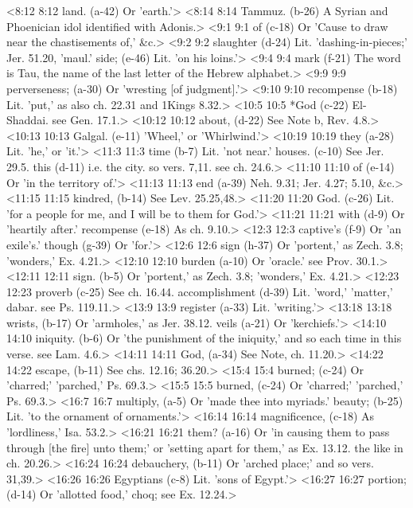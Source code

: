 <8:12 8:12  land. (a-42)  Or 'earth.'>
<8:14 8:14  Tammuz. (b-26)  A Syrian and Phoenician idol identified with Adonis.>
<9:1 9:1  of (c-18)  Or 'Cause to draw near the chastisements of,' &c.>
<9:2 9:2  slaughter (d-24)  Lit. 'dashing-in-pieces;' Jer. 51.20, 'maul.'
  side; (e-46)  Lit. 'on his loins.'>
<9:4 9:4  mark (f-21)  The word is Tau, the name of the last letter of the Hebrew  alphabet.>
<9:9 9:9  perverseness; (a-30)  Or 'wresting [of judgment].'>
<9:10 9:10  recompense (b-18)  Lit. 'put,' as also ch. 22.31 and 1Kings 8.32.>
<10:5 10:5  *God (c-22)  El-Shaddai. see Gen. 17.1.>
<10:12 10:12  about, (d-22)  See Note b, Rev. 4.8.>
<10:13 10:13  Galgal. (e-11)  'Wheel,' or 'Whirlwind.'>
<10:19 10:19  they (a-28)  Lit. 'he,' or 'it.'>
<11:3 11:3  time (b-7)  Lit. 'not near.'
  houses. (c-10)  See Jer. 29.5.
  this (d-11)  i.e. the city. so vers. 7,11. see ch. 24.6.>
<11:10 11:10  of (e-14)  Or 'in the territory of.'>
<11:13 11:13  end (a-39)  Neh. 9.31; Jer. 4.27; 5.10, &c.>
<11:15 11:15  kindred, (b-14)  See Lev. 25.25,48.>
<11:20 11:20  God. (c-26)  Lit. 'for a people for me, and I will be to them for God.'>
<11:21 11:21  with (d-9)  Or 'heartily after.'
  recompense (e-18)  As ch. 9.10.>
<12:3 12:3  captive's (f-9)  Or 'an exile's.'
  though (g-39)  Or 'for.'>
<12:6 12:6  sign (h-37)  Or 'portent,' as Zech. 3.8; 'wonders,' Ex. 4.21.>
<12:10 12:10  burden (a-10)  Or 'oracle.' see Prov. 30.1.>
<12:11 12:11  sign. (b-5)  Or 'portent,' as Zech. 3.8; 'wonders,' Ex. 4.21.>
<12:23 12:23  proverb (c-25)  See ch. 16.44.
  accomplishment (d-39)  Lit. 'word,' 'matter,' dabar. see Ps. 119.11.>
<13:9 13:9  register (a-33)  Lit. 'writing.'>
<13:18 13:18  wrists, (b-17)  Or 'armholes,' as Jer. 38.12.
  veils (a-21)  Or 'kerchiefs.'>
<14:10 14:10  iniquity. (b-6)  Or 'the punishment of the iniquity,' and so each time in this  verse. see Lam. 4.6.>
<14:11 14:11  God, (a-34)  See Note, ch. 11.20.>
<14:22 14:22  escape, (b-11)  See chs. 12.16; 36.20.>
<15:4 15:4  burned; (c-24) Or 'charred;' 'parched,' Ps. 69.3.>
<15:5 15:5  burned, (c-24)  Or 'charred;' 'parched,' Ps. 69.3.>
<16:7 16:7  multiply, (a-5)  Or 'made thee into myriads.'
  beauty; (b-25)  Lit. 'to the ornament of ornaments.'>
<16:14 16:14  magnificence, (c-18)  As 'lordliness,' Isa. 53.2.>
<16:21 16:21  them? (a-16)  Or 'in causing them to pass through [the fire] unto them;' or  'setting apart for them,' as Ex. 13.12. the like in ch. 20.26.>
<16:24 16:24  debauchery, (b-11)  Or 'arched place;' and so vers. 31,39.>
<16:26 16:26  Egyptians (c-8)  Lit. 'sons of Egypt.'>
<16:27 16:27  portion; (d-14)  Or 'allotted food,' choq; see Ex. 12.24.>

